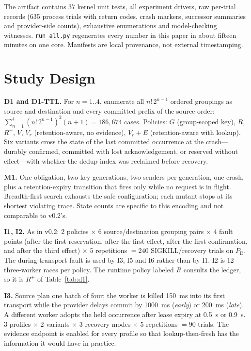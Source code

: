 \documentclass[conference,10pt]{IEEEtran}
\newcommand{\PD}{P_{\mathrm{D}}}
\begin{document}
The artifact contains 37 kernel unit tests, all experiment drivers, raw per-trial records (635 process trials with return codes, crash markers, successor summaries and provider-side counts), exhaustive enumerations and model-checking witnesses. \texttt{run\_all.py} regenerates every number in this paper in about fifteen minutes on one core. Manifests are local provenance, not external timestamping.

\section{Study Design}

\textbf{D1 and D1-TTL.} For $n=1..4$, enumerate all $n!\,2^{n-1}$ ordered groupings as source and destination and every committed prefix of the source order: $\sum_{n=1}^{4}(n!\,2^{n-1})^2(n{+}1)=186{,}674$ cases. Policies: $G$ (group-scoped key), $R$, $R^{+}$, $V$, $V_r$ (retention-aware, no evidence), $V_r{+}E$ (retention-aware with lookup). Six variants cross the state of the last committed occurrence at the crash---durably confirmed, committed with lost acknowledgement, or reserved without effect---with whether the dedup index was reclaimed before recovery.

\textbf{M1.} One obligation, two key generations, two senders per generation, one crash, plus a retention-expiry transition that fires only while no request is in flight. Breadth-first search exhausts the safe configuration; each mutant stops at its shortest violating trace. State counts are specific to this encoding and not comparable to v0.2's.

\textbf{I1, I2.} As in v0.2: 2 policies $\times$ 6 source/destination grouping pairs $\times$ 4 fault points (after the first reservation, after the first effect, after the first confirmation, and after the third effect) $\times$ 5 repetitions $=240$ SIGKILL/recovery trials on $\PD$. The during-transport fault is used by I3, I5 and I6 rather than by I1. I2 is 12 three-worker races per policy. The runtime policy labeled $R$ consults the ledger, so it is $R^{+}$ of Table~\ref{tab:d1}.

\textbf{I3.} Source plan one batch of four; the worker is killed 150~ms into its first transport while the provider delays commit by 1000~ms (\emph{early}) or 200~ms (\emph{late}). A different worker adopts the held occurrence after lease expiry at 0.5~s or 0.9~s. $3$ profiles $\times$ $2$ variants $\times$ $3$ recovery modes $\times$ 5 repetitions $=90$ trials. The evidence endpoint is enabled for every profile so that lookup-then-fresh has the information it would have in practice.
\end{document}
